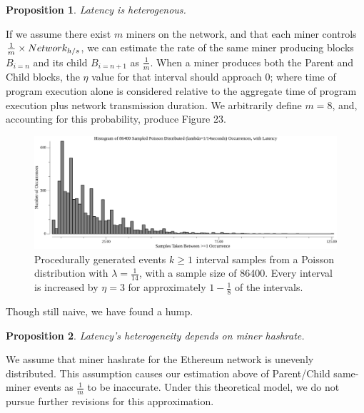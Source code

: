\documentclass[11pt]{article}
\theoremstyle{plain}
\newtheorem{proposition}{Proposition}[section]
\begin{document}
\vspace{5mm}
\begin{proposition}
  Latency is heterogenous.
\end{proposition}

If we assume there exist $m$ miners on the network, and that each miner 
controls $\frac{1}{m} \times Network_{h/s}$, we can estimate the rate of the 
same miner producing blocks $B_{i=n}$ and its child $B_{i=n+1}$ as 
$\frac{1}{m}$.
When a miner produces both the Parent and Child blocks, the $\eta$ value for
that interval should approach $0$; where time of program execution alone is 
considered relative to the aggregate time of program execution plus network 
transmission duration.
We arbitrarily define $m=8$, and, accounting for this probability, produce 
Figure 23.

\begin{figure}[tph]
    \centering

\includegraphics[width=1.0\textwidth]{go-block-step/out/vis_poisson_samples_eventintervals_latencysamesame_hist.png}
    \caption{
      Procedurally generated events $k \geq 1$ interval samples from a Poisson distribution
with $\lambda = \frac{1}{14}$, with a sample size of 86400.
      Every interval is increased by $\eta=3$ for approximately
$1-\frac{1}{8}$ of the intervals.
    }
\end{figure}

Though still naive, we have found a hump.

\vspace{5mm}
\begin{proposition}
  Latency's heterogeneity depends on miner hashrate. %
\end{proposition}

We assume that miner hashrate for the Ethereum network is unevenly distributed.
This assumption causes our estimation above of Parent/Child same-miner events
as $\frac{1}{m}$ to be inaccurate.
Under this theoretical model, we do not pursue further revisions for this
approximation.
\end{document}
